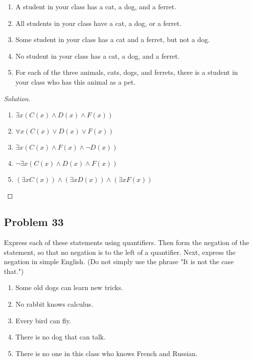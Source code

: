 \documentclass{article}
\newenvironment{solution}{\renewcommand\qedsymbol{}\begin{proof}[Solution]}{\end{proof}}
\begin{document}
\begin{enumerate}[leftmargin=16pt, topsep = 8pt]
\item A student in your class has a cat, a dog, and a ferret.
\item All students in your class have a cat, a dog, or a ferret.
\item Some student in your class has a cat and a ferret, but not a dog.
\item No student in your class has a cat, a dog, and a ferret.
\item For each of the three animals, cats, dogs, and ferrets, there is a student in your class who has this animal as a pet.
\end{enumerate}

\begin{solution}
\hspace{1pt}

\begin{enumerate}
\item $\exists x(C(x) \land D(x) \land F(x))$
\item $\forall x(C(x) \lor D(x) \lor F(x))$
\item $\exists x(C(x) \land F(x) \land \neg D(x))$
\item $\neg \exists x(C(x) \land D(x) \land F(x))$
\item $(\exists xC(x)) \land (\exists xD(x)) \land (\exists xF(x))$
\end{enumerate}
\end{solution}

\clearpage
\subsection*{Problem 33}
Express each of these statements using quantifiers. Then form the negation of the statement, so that no negation is to the left of a quantifier. Next, express the negation in simple English. (Do not simply use the phrase "It is not the case that.")

\begin{enumerate}[leftmargin=16pt, topsep = 8pt]
\item Some old dogs can learn new tricks.
\item No rabbit knows calculus.
\item Every bird can fly.
\item There is no dog that can talk.
\item There is no one in this class who knows French and Russian.
\end{enumerate}
\end{document}
